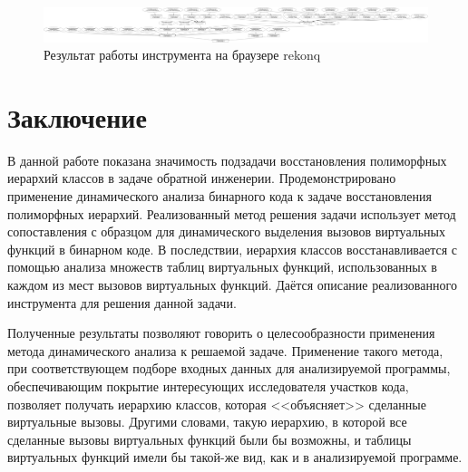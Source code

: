 \documentclass[a4paper,12pt,russian]{article}
\newcommand{\code}[1]{\textsf{#1}}
\begin{document}
\begin{figure}[b]
  \center
  \includegraphics[width=\textwidth]{rekonq-hier.png}
  \hfill
  \caption{Результат работы инструмента на браузере \code{rekonq}}
  \label{rekonq_res_fig}
\end{figure}

\clearpage
\newpage
\section{Заключение}
В данной работе показана значимость подзадачи восстановления полиморфных иерархий классов в задаче обратной инженерии.
Продемонстрировано применение динамического анализа бинарного кода к задаче восстановления полиморфных иерархий.
Реализованный метод решения задачи использует метод сопоставления с образцом для динамического выделения вызовов виртуальных функций в бинарном коде.
В последствии, иерархия классов восстанавливается с помощью анализа множеств таблиц виртуальных функций, использованных в каждом из мест вызовов виртуальных функций.
Даётся описание реализованного инструмента для решения данной задачи.

Полученные результаты позволяют говорить о целесообразности применения метода динамического анализа к решаемой задаче.
Применение такого метода, при соответствующем подборе входных данных для анализируемой программы, обеспечивающим покрытие интересующих исследователя участков кода, позволяет получать иерархию классов, которая <<объясняет>> сделанные виртуальные вызовы.
Другими словами, такую иерархию, в которой все сделанные вызовы виртуальных функций были бы возможны, и таблицы виртуальных функций имели бы такой-же вид, как и в анализируемой программе.

\clearpage
\end{document}

